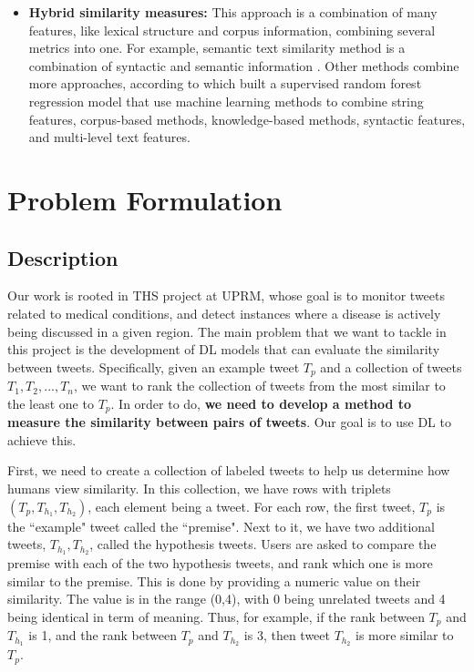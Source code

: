 \documentclass[12pt]{report}
\begin{document}
\begin{itemize}[nolistsep]
	\item \textbf{Hybrid similarity measures:} This approach is a combination of many features, like lexical structure and corpus information, combining several metrics into one. For example, semantic text similarity method is a combination of syntactic and semantic information \cite{Gomaa2013,Zhang2015}. Other methods combine more approaches, according to \cite{Zhu2014} which built a supervised random forest regression model that use machine learning methods to combine string features, corpus-based methods, knowledge-based methods, syntactic features, and multi-level text features.
	
\end{itemize}

\chapter{Problem Formulation} \label{chapter 3}
\section{Description}
Our work is rooted in \ac{THS} project at UPRM, whose goal is to monitor tweets related to medical conditions, and detect instances where
a disease is actively being discussed in a given region.
The main problem that we want to tackle in this project is the development of  \ac{DL} models that can evaluate the similarity between
tweets. Specifically, given an example tweet $T_p$ and a collection of tweets $T_1, T_2, ..., T_n$, we want to rank the collection of tweets
from the most similar to the least one to $T_p$. In order to do, {\bf we need to develop a method to measure the similarity between pairs of 
	tweets}. Our goal is to use \ac{DL} to achieve this. 

First, we need to create a collection of labeled tweets to help us determine how humans 
view similarity. In this collection, we have rows with triplets $(T_p, T_{h_1}, T_{h_2})$, each element being a tweet. For each row, the first tweet, $T_p$ is the ``example" tweet called the ``premise". Next to it, we have two additional tweets, $T_{h_1}, T_{h_2}$, called the
hypothesis tweets. Users are asked to compare the premise with each of the two hypothesis tweets, and rank which one is more similar to the 
premise. This is done by providing a numeric value on their similarity. The value is in the range (0,4), with 0 being unrelated tweets and 4 being identical in term of meaning. Thus, for example, if the rank between $T_p$ and  $T_{h_1}$ is 1, and the rank between $T_p$ and  $T_{h_2}$ is 3, then 
tweet $T_{h_2}$ is more similar to $T_p$.
\end{document}
